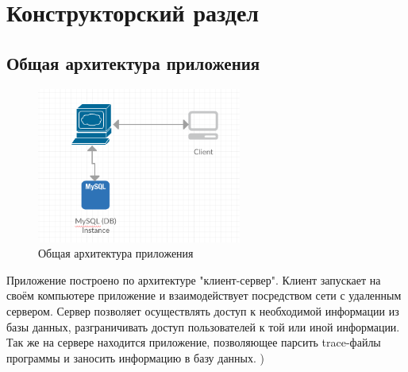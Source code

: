 \chapter{Конструкторский раздел}
\label{cha:design}
\section{Общая архитектура приложения}
\begin{figure}[h!]
	\centering
	\includegraphics[width=0.6\textwidth]{img/img5.png}
	\caption{Общая архитектура приложения}
	\label{fig:spire09}
\end{figure}
Приложение построено по архитектуре "клиент-сервер". Клиент запускает на своём компьютере приложение и взаимодействует посредством сети с удаленным сервером. Сервер позволяет осуществлять доступ к необходимой информации из базы данных, разграничивать доступ пользователей к той или иной информации. Так же на сервере находится приложение, позволяющее парсить trace-файлы программы и заносить информацию в базу данных.
)

